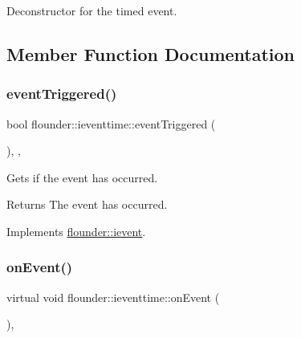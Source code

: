 Deconstructor for the timed event. 



\subsection{Member Function Documentation}
\mbox{\label{classflounder_1_1ieventtime_a471aad4d2412507875077747ea9ea7a6}} 
\subsubsection{\texorpdfstring{event\+Triggered()}{eventTriggered()}}
{\footnotesize\ttfamily bool flounder\+::ieventtime\+::event\+Triggered (\begin{DoxyParamCaption}{ }\end{DoxyParamCaption})\hspace{0.3cm}{\ttfamily [inline]}, {\ttfamily [override]}, {\ttfamily [virtual]}}



Gets if the event has occurred. 

\begin{DoxyReturn}{Returns}
The event has occurred. 
\end{DoxyReturn}


Implements \hyperlink{classflounder_1_1ievent_a4462f66feef99ef4e3521c00f4edd0c9}{flounder\+::ievent}.

\mbox{\label{classflounder_1_1ieventtime_abef43da596dc22fc9b7104fff88c1a9d}} 
\subsubsection{\texorpdfstring{on\+Event()}{onEvent()}}
{\footnotesize\ttfamily virtual void flounder\+::ieventtime\+::on\+Event (\begin{DoxyParamCaption}{ }\end{DoxyParamCaption})\hspace{0.3cm}{\ttfamily [override]}, {}}



